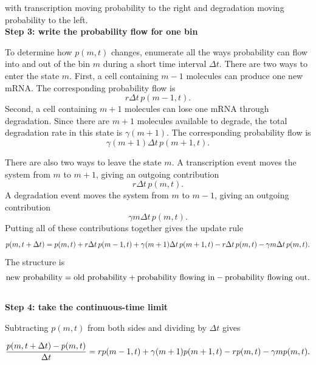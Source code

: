 with transcription moving probability to the right and degradation moving probability to the left.
% 
% 
\medskip
\\
\textbf{Step 3: write the probability flow for one bin}

To determine how $p(m,t)$ changes, enumerate all the ways probability can flow into and out of the bin $m$ during a short time interval $\Delta t$.
There are two ways to enter the state $m$.
First, a cell containing $m-1$ molecules can produce one new mRNA.
The corresponding probability flow is
\[
    r\Delta t\,p(m-1,t).
\]
Second, a cell containing $m+1$ molecules can lose one mRNA through degradation.
Since there are $m+1$ molecules available to degrade, the total degradation rate in this state is $\gamma(m+1)$.
The corresponding probability flow is
\[
    \gamma(m+1)\Delta t\,p(m+1,t).
\]

There are also two ways to leave the state $m$.
A transcription event moves the system from $m$ to $m+1$, giving an outgoing contribution
\[
    r\Delta t\,p(m,t).
\]
A degradation event moves the system from $m$ to $m-1$, giving an outgoing contribution
\[
    \gamma m\Delta t\,p(m,t).
\]
Putting all of these contributions together gives the update rule
\[
    p(m,t+\Delta t)
    \\
    = p(m,t)
    \\
    + r\Delta t\,p(m-1,t)
    \\
    + \gamma(m+1)\Delta t\,p(m+1,t)
    \\
    - r\Delta t\,p(m,t)
    \\
    - \gamma m\Delta t\,p(m,t).
\]
The structure is
\[
    \text{new probability}
    \\
    = \text{old probability}
    \\
    + \text{probability flowing in}
    \\
    - \text{probability flowing out}.
\]
% 
% 
\medskip
\\
\textbf{Step 4: take the continuous-time limit}

Subtracting $p(m,t)$ from both sides and dividing by $\Delta t$ gives

\[
    \frac{p(m,t+\Delta t)-p(m,t)}{\Delta t}
    \\
    = rp(m-1,t)
    \\
    + \gamma(m+1)p(m+1,t)
    \\
    - rp(m,t)
    \\
    - \gamma m p(m,t).
\]

